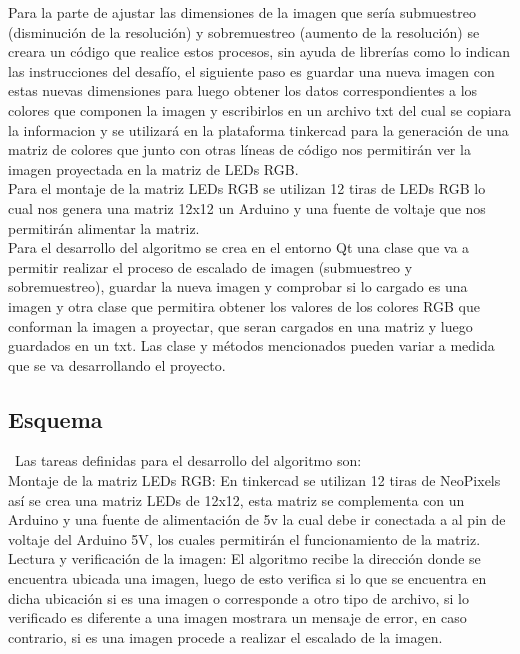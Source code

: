 \documentclass{article}
\begin{document}
Para la parte de ajustar las dimensiones de la imagen que sería submuestreo (disminución de la resolución) y sobremuestreo (aumento de la resolución) se creara un código que realice estos procesos, sin ayuda de librerías como lo indican las instrucciones del desafío, el siguiente paso es guardar una nueva imagen con estas nuevas dimensiones para luego obtener los datos correspondientes a los colores que componen la imagen y escribirlos en un archivo txt del cual se copiara la informacion y se  utilizará en la plataforma tinkercad para la generación de una matriz de colores que junto con otras líneas de código nos permitirán ver la imagen proyectada en la matriz de LEDs RGB.\\

Para el montaje de la matriz LEDs RGB se utilizan 12 tiras de LEDs RGB lo cual nos genera una matriz 12x12 un Arduino y una fuente de voltaje que nos permitirán alimentar la matriz.\\
Para el desarrollo del algoritmo se crea en el entorno Qt una clase que va a permitir realizar el proceso de escalado de imagen (submuestreo y sobremuestreo), guardar la nueva imagen y comprobar si lo cargado es una imagen y otra clase que permitira obtener los valores de los colores RGB que conforman la imagen a proyectar, que seran cargados en una matriz y luego guardados en un txt. Las clase y métodos mencionados pueden variar a medida que se va desarrollando el proyecto.

\subsection{Esquema}
\
Las tareas definidas para el desarrollo del algoritmo son:\\
Montaje de la matriz LEDs RGB: En tinkercad se utilizan 12 tiras de NeoPixels así se crea una matriz LEDs de 12x12, esta matriz se complementa con un Arduino y una fuente de alimentación de 5v la cual debe ir conectada a al pin de voltaje del Arduino 5V, los cuales permitirán el funcionamiento de la matriz.\\

Lectura y verificación de la imagen: El algoritmo recibe la dirección donde se encuentra ubicada una imagen, luego de esto verifica si lo que se encuentra en dicha ubicación si es una imagen o corresponde a otro tipo de archivo, si lo verificado es diferente a una imagen mostrara un mensaje de error, en caso contrario, si es una imagen procede a realizar el escalado de la imagen.\\
\end{document}
